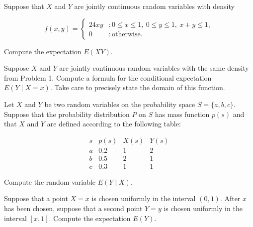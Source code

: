 \documentclass[12pt,reqno]{amsart}
\begin{document}
\bigskip

\prob Suppose that $X$ and $Y$ are jointly continuous random variables with density

	\[
	f(x,y) = \begin{cases}
	24xy & : 0\leq x \leq 1, \ 0 \leq y \leq 1, \ x+y \leq 1, \\
	0 & : \text{otherwise}.
	\end{cases}
	\]

Compute the expectation $E(XY)$.









\vfill
\prob Suppose $X$ and $Y$ are jointly continuous random variables with the same density from Problem 1. Compute a formula for the conditional expectation $E(Y\mid X=x)$. Take care to precisely state the domain of this function.

















\vfill
\newpage
\prob Let $X$ and $Y$ be two random variables on the probability space $S = \{a,b,c\}$. Suppose that the probability distribution $P$ on $S$ has mass function $p(s)$ and that $X$ and $Y$ are defined according to the following table:

	\[
	\begin{array}{c|ccc}
	s & p(s) & X(s) & Y(s) \\ \hline
	a & 0.2 & 1 & 2 \\
	b & 0.5 & 2 & 1 \\
	c & 0.3 & 1 & 1
	\end{array}
	\] 

Compute the random variable $E(Y \mid X)$.















\vfill
\prob Suppose that a point $X=x$ is chosen uniformly in the interval $(0,1)$. After $x$ has been chosen, suppose that a second point $Y=y$ is chosen uniformly in the interval $[x,1]$. Compute the expectation $E(Y)$.
\end{document}
